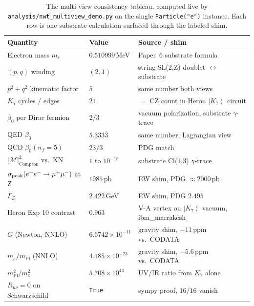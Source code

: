 \documentclass[11pt]{article}
\newcommand{\ket}[1]{\left|#1\right\rangle}
\newcommand{\mPl}{m_{\mathrm{Pl}}}
\newcommand{\me}{m_e}
\begin{document}
\begin{table}[H]
\centering
\small
\begin{tabular}{lll}
\toprule
\textbf{Quantity} & \textbf{Value} & \textbf{Source / shim} \\
\midrule
Electron mass $\me$           & $0.510999$\,MeV    & Paper~6 substrate formula \\
$(p, q)$ winding              & $(2, 1)$           & string SL(2,Z) doublet $\leftrightarrow$ substrate \\
$p^2 + q^2$ kinematic factor  & $5$                & same number both views \\
$K_7$ cycles / edges          & $21$               & $=$ CZ count in Heron $\ket{K_7}$ circuit \\
$\beta_0$ per Dirac fermion   & $2/3$              & vacuum polarization, substrate $\gamma$-trace \\
QED $\beta_0$                 & $5.333\overline{3}$ & same number, Lagrangian view \\
QCD $\beta_0(n_f=5)$          & $23/3$             & PDG match \\
$|\mathcal{M}|^2_{\mathrm{Compton}}$ vs.\ KN
                              & $1$ to $10^{-15}$  & substrate Cl(1,3) $\gamma$-trace \\
$\sigma_{\rm peak}(e^+e^-\to\mu^+\mu^-)$ at Z
                              & $1985$\,pb          & EW shim, PDG $\approx 2000$\,pb \\
$\Gamma_Z$                    & $2.422$\,GeV        & EW shim, PDG $2.495$ \\
Heron Exp 10 contrast         & $0.963$             & V-A vertex on $\ket{K_7}$ vacuum, ibm\_marrakesh \\
$G$ (Newton, NNLO)            & $6.6742\times 10^{-11}$ & gravity shim, $-11$\,ppm vs.\ CODATA \\
$\me / \mPl$ (NNLO)           & $4.185\times 10^{-23}$ & gravity shim, $-5.6$\,ppm vs.\ CODATA \\
$\mPl^2 / \me^2$              & $5.708\times 10^{44}$ & UV/IR ratio from $K_7$ alone \\
$R_{\mu\nu} = 0$ on Schwarzschild
                              & \texttt{True}      & sympy proof, $16$/$16$ vanish \\
\bottomrule
\end{tabular}
\caption{The multi-view consistency tableau, computed live by
\texttt{analysis/nwt\_multiview\_demo.py} on the single
\texttt{Particle("e")} instance.  Each row is one substrate
calculation surfaced through the labeled shim.}
\label{tab:multiview-synthesis}
\end{table}
\end{document}
